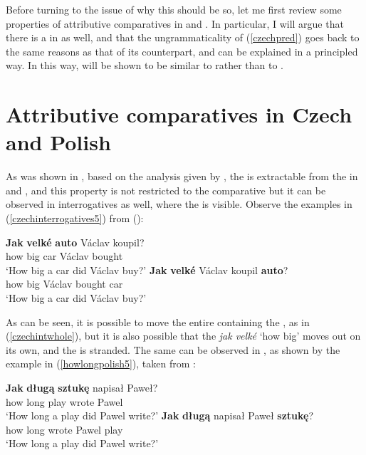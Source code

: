 Before turning to the issue of why this should be so, let me first review some properties of attributive comparatives in  and . In particular, I will argue that there is a  in  as well, and that the ungrammaticality of (\ref{czechpred}) goes back to the same reasons as that of its  counterpart, and can be explained in a principled way. In this way,  will be shown to be similar to  rather than to .

\section{Attributive comparatives in Czech and Polish} \label{sec:5attributive}
As was shown in , based on the analysis given by \citet{kennedymerchant2000}, the  is extractable from the  in  and , and this property is not restricted to the comparative  but it can be observed in interrogatives as well, where the  is visible. Observe the examples in (\ref{czechinterrogatives5}) from  (\citealt[104, ex. 30]{kennedymerchant2000}):

\ea \label{czechinterrogatives5}
\ea \gll \textbf{Jak} \textbf{velké} \textbf{auto}	Václav koupil? \label{czechintwhole}\\
how	big	car	Václav bought\\
\glt `How big a car did Václav buy?'
\ex \gll \textbf{Jak} \textbf{velké} Václav	koupil \textbf{auto}?\\
how	big Václav bought	car\\
\glt `How big a car did Václav buy?'
\z
\z

As can be seen, it is possible to move the entire  containing the , as in (\ref{czechintwhole}), but it is also possible that the  \textit{jak velké} `how big' moves out on its own, and the  is stranded. The same can be observed in , as shown by the example in (\ref{howlongpolish5}), taken from \citet[104, ex. 29]{kennedymerchant2000}:

\ea \label{howlongpolish5}
\ea \gll \textbf{Jak} \textbf{d\l{}ug\k{a}} \textbf{sztuk\k{e}} napisa\l{} Pawe\l{}?\\ 
how long play wrote Pawel\\
\glt `How long a play did Pawel write?'
\ex \gll \textbf{Jak} \textbf{d\l{}ug\k{a}} napisa\l{} Pawe\l{} \textbf{sztuk\k{e}}?\\
how long wrote Pawel play\\
\glt `How long a play did Pawel write?'
\z
\z


